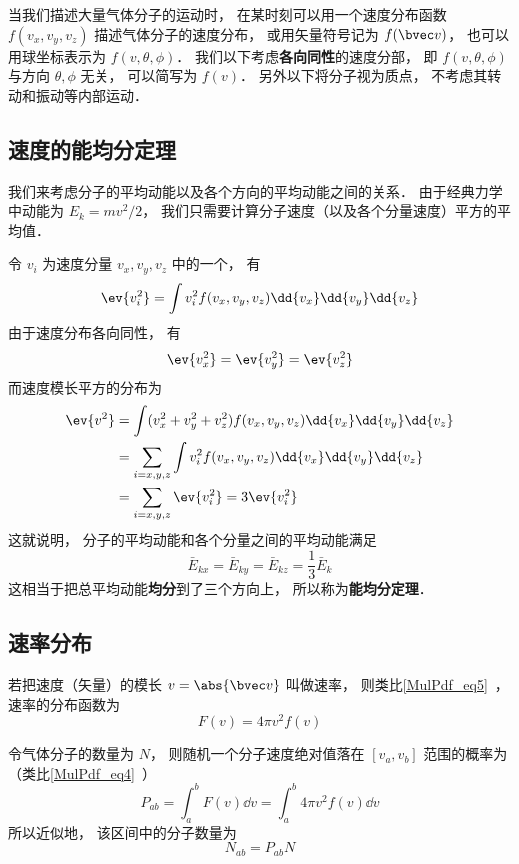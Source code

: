 
\begin{issues}
\issueTODO
\end{issues}

当我们描述大量气体分子的运动时， 在某时刻可以用一个速度分布函数 $f(v_x, v_y, v_z)$ 描述气体分子的速度分布， 或用矢量符号记为 $f(\bvec v)$， 也可以用球坐标表示为 $f(v, \theta, \phi)$． 我们以下考虑\textbf{各向同性}的速度分部， 即 $f(v, \theta, \phi)$ 与方向 $\theta, \phi$ 无关， 可以简写为 $f(v)$． 另外以下将分子视为质点， 不考虑其转动和振动等内部运动．

\subsection{速度的能均分定理}
我们来考虑分子的平均动能以及各个方向的平均动能之间的关系． 由于经典力学中动能为 $E_k = mv^2/2$， 我们只需要计算分子速度（以及各个分量速度）平方的平均值．

令 $v_i$ 为速度分量 $v_x, v_y, v_z$ 中的一个， 有
\begin{equation}
\ev{v_i^2} = \int v_i^2 f(v_x, v_y, v_z) \dd{v_x}\dd{v_y}\dd{v_z}
\end{equation}
由于速度分布各向同性， 有
\begin{equation}
\ev{v_x^2} = \ev{v_y^2} = \ev{v_z^2}
\end{equation}
而速度模长平方的分布为
\begin{equation}
\begin{aligned}
\ev{v^2} &= \int (v_x^2 + v_y^2 + v_z^2) f(v_x, v_y, v_z) \dd{v_x}\dd{v_y}\dd{v_z}\\
&= \sum_{i = x,y,z} \int v_i^2 f(v_x, v_y, v_z) \dd{v_x}\dd{v_y}\dd{v_z}\\
&= \sum_{i = x,y,z} \ev{v_i^2} = 3 \ev{v_i^2}
\end{aligned}
\end{equation}
这就说明， 分子的平均动能和各个分量之间的平均动能满足
\begin{equation}\label{VelPdf_eq1}
\bar E_{kx} = \bar E_{ky} = \bar E_{kz} = \frac{1}{3} \bar E_k
\end{equation}
这相当于把总平均动能\textbf{均分}到了三个方向上， 所以称为\textbf{能均分定理}．

\subsection{速率分布}
若把速度（矢量）的模长 $v = \abs{\bvec v}$ 叫做速率， 则类比\autoref{MulPdf_eq5}~， 速率的分布函数为
\begin{equation}
F(v) = 4\pi v^2 f(v)
\end{equation}

令气体分子的数量为 $N$， 则随机一个分子速度绝对值落在 $[v_a, v_b]$ 范围的概率为（类比\autoref{MulPdf_eq4}~）
\begin{equation}
P_{ab} = \int_a^b F(v) \dd{v} = \int_a^b 4\pi v^2 f(v) \dd{v}
\end{equation}
所以近似地， 该区间中的分子数量为
\begin{equation}
N_{ab} = P_{ab} N
\end{equation}

